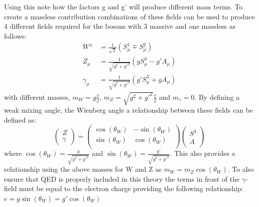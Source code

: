 Using this note how the factors g and g' will produce different mass terms. To create a massless contribution combinations of these fields can be used to produce 4 different fields required for the bosons with 3 massive and one massless as follows:
\begin{align}
W^\pm &= \frac{1}{\sqrt{2}}(S_\mu^1 \mp S_\mu^2)\\
Z_\mu &= \frac{1}{\sqrt{g^2+g'^2}}(gS_\mu^3 - g' A_\mu)\\
\gamma_\mu &= \frac{1}{\sqrt{g^2+g'^2}}(g'S_\mu^3 + g A_\mu)
\end{align}
with different masses, $m_W = g\frac{v}{2}$, $m_Z = \sqrt{g^2+g'^2}\frac{v}{2}$ and $m_\gamma = 0$. By defining a weak mixing angle, the Wienberg angle a relationship between these fields can be defined as:
\begin{equation}
\begin{pmatrix}
    Z\\
 \gamma
\end{pmatrix}
=
\begin{pmatrix}
    \cos(\theta_W) & -\sin(\theta_W)\\
    \sin(\theta_W) & \cos(\theta_W)\\
\end{pmatrix}
\begin{pmatrix}
    S^3\\
  A
\end{pmatrix}
\end{equation}
where $\cos(\theta_W) = \frac{g}{\sqrt{g^2+g'^2}}$ and $\sin(\theta_W) = \frac{g'}{\sqrt{g^2+g'^2}}$. This also provides a relationship using the above masses for W and Z as $m_W = m_Z \cos(\theta_W)$. To also ensure that QED is properly included in this theory the terms in front of the $\gamma$-field must be equal to the electron charge providing the following relationship:
$e = g \sin(\theta_W) = g' \cos(\theta_W)$

